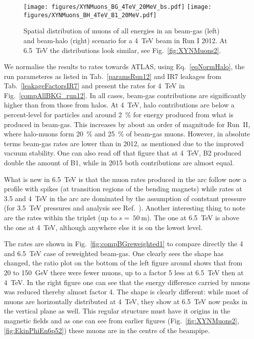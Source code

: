 \begin{figure} %
  \centering
  \texttt{[image: figures/XYNMuons\_BG\_4TeV\_20MeV\_bs.pdf]}
  \texttt{[image: figures/XYNMuons\_BH\_4TeV\_B1\_20MeV.pdf]}
  \caption{Spatial distribution of muons of all energies in an beam-gas (left) and beam-halo (right) scenario for a 4~TeV beam in Run I 2012. At 6.5~TeV the distributions look similar, see Fig.~\ref{fig:XYNMuons2}.
    \label{fig:XYNMuons}}
\end{figure}


We normalise the results to rates towards ATLAS, using Eq.~\ref{eqNormHalo}, the run parameteres as listed in Tab.~\ref{paramsRun12} and IR7 leakages from Tab.~\ref{leakageFactorsIR7} and present the rates for 4~TeV in Fig.~\ref{compAllBKG_run12}. In all cases, beam-gas contributions are significantly higher than from those from halos. At 4~TeV, halo contributions are below a percent-level for particles and around 2~\% for energy produced from what is produced in beam-gas. This increases by about an order of magnitude for Run~II, where halo-muons form 20~\% and 25~\% of beam-gas muons. However, in absolute terms beam-gas rates are lower than in 2012, as mentioned due to the improved vacuum stability. One can also read off that figure that at 4~TeV, B2 produced double the amount of B1, while in 2015 both contributions are almost equal.

What is new in 6.5~TeV is that the muon rates produced in the arc follow now a profile with spikes (at transition regions of the bending magnets) while rates at 3.5 and 4~TeV in the arc are dominated by the assumption of contstant pressure (for 3.5~TeV pressures and analysis see Ref.~\cite{nimPaperRod}). Another interesting thing to note are the rates within the triplet (up to $s =~50~$m). The one at 6.5~TeV is above the one at 4~TeV, although anywhere else it is on the lowest level.

The rates are shown in Fig.~\ref{fig:compBGreweighted1} to compare directly the 4 and 6.5~TeV case of reweighted beam-gas. One clearly sees the shape has changed, the ratio plot on the bottom of the left figure around shows that from 20 to 150~GeV there were fewer muons, up to a factor 5 less at 6.5~TeV then at 4~TeV. In the right figure one can see that the energy difference carried by muons was reduced thereby almost factor 4. The shape is clearly different: while most of muons are horizontally distributed at 4~TeV, they show at 6.5~TeV now peaks in the vertical plane as well. This regular structure must have it origins in the magnetic fields and as one can see from earlier figures (Fig.~\ref{fig:XYNMuons2}, \ref{fig:EkinPhiEn6p52}) these muons are in the centre of the beampipe. 

